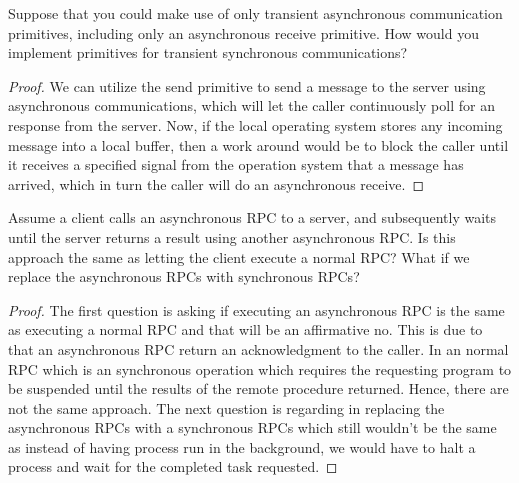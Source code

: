 \documentclass[12pt]{article}
\newenvironment{exercise}[2][Exercise]{\begin{trivlist}
\item[\hskip \labelsep {\bfseries #1}\hskip \labelsep {\bfseries #2.}]}{\end{trivlist}}
\begin{document}
\begin{exercise}{9}
Suppose that you could make use of only transient asynchronous communication primitives, including only an asynchronous receive primitive. How would you implement primitives for transient synchronous communications?
\end{exercise}

\begin{proof}
We can utilize the send primitive to send a message to the server using asynchronous communications, which will let the caller continuously poll for an response from the server. Now, if the local operating system stores any incoming message into a local buffer, then a work around would be to block the caller until it receives a specified signal from the operation system that a message has arrived, which in turn the caller will do an asynchronous receive.
\end{proof}

\begin{exercise}{10}
Assume a client calls an asynchronous RPC to a server, and subsequently waits until the server returns a result using another asynchronous RPC. Is this approach the same as letting the client execute a normal RPC? What if we replace the asynchronous RPCs with synchronous RPCs?
\end{exercise}

\begin{proof}
The first question is asking if executing an asynchronous RPC is the same as executing a normal RPC and that will be an affirmative no. This is due to that an asynchronous RPC return an acknowledgment to the caller. In an normal RPC which is an synchronous operation which requires the requesting program to be suspended until the results of the remote procedure returned. Hence, there are not the same approach. The next question is regarding in replacing the asynchronous RPCs with a synchronous RPCs which still wouldn't be the same as instead of having process run in the background, we would have to halt a process and wait for the completed task requested. 
\end{proof}
 
\end{document}
